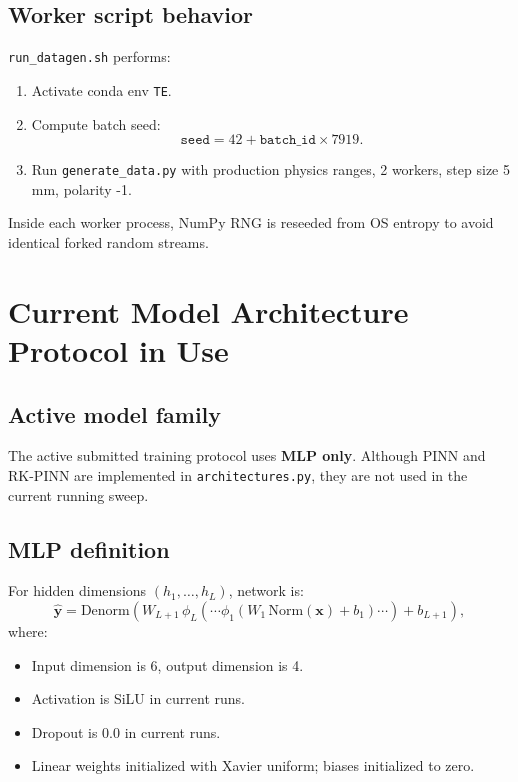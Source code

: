 \documentclass[11pt,a4paper]{article}
\begin{document}
\subsection{Worker script behavior}
\texttt{run\_datagen.sh} performs:
\begin{enumerate}[leftmargin=*]
  \item Activate conda env \texttt{TE}.
  \item Compute batch seed:
  \begin{equation*}
  \texttt{seed} = 42 + \texttt{batch\_id}\times 7919.
  \end{equation*}
  \item Run \texttt{generate\_data.py} with production physics ranges, 2 workers, step size 5 mm, polarity -1.
\end{enumerate}
Inside each worker process, NumPy RNG is reseeded from OS entropy to avoid identical forked random streams.

\section{Current Model Architecture Protocol in Use}
\subsection{Active model family}
The active submitted training protocol uses \textbf{MLP only}. Although PINN and RK-PINN are implemented in \texttt{architectures.py}, they are not used in the current running sweep.

\subsection{MLP definition}
For hidden dimensions $(h_1,\dots,h_L)$, network is:
\begin{equation}
\hat{\mathbf{y}} = \mathrm{Denorm}\left( W_{L+1}\,\phi_L\left(\cdots\phi_1(W_1\,\mathrm{Norm}(\mathbf{x})+b_1)\cdots\right)+b_{L+1} \right),
\end{equation}
where:
\begin{itemize}[leftmargin=*]
  \item Input dimension is 6, output dimension is 4.
  \item Activation is SiLU in current runs.
  \item Dropout is 0.0 in current runs.
  \item Linear weights initialized with Xavier uniform; biases initialized to zero.
\end{itemize}
\end{document}
